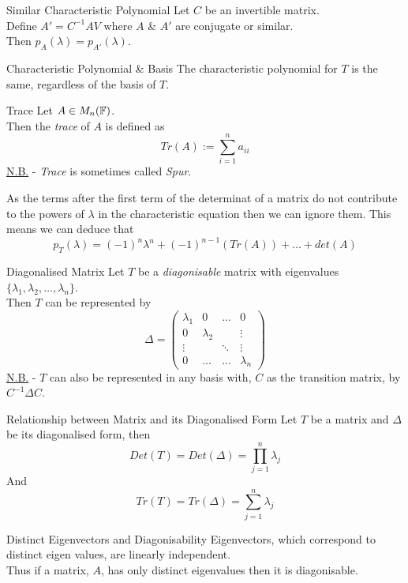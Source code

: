 \documentclass[11pt,a4paper]{article}
\begin{document}
\subtitle{Theorem 8.08 - }{Similar Characteristic Polynomial}
Let $C$ be an invertible matrix.\\
Define $A' = C^{-1}AV$ where $A$ \& $A'$ are conjugate or similar.\\
Then $p_A(\lambda) = p_{A'}(\lambda)$.\\

\subtitle{Theorem 8.09 - }{Characteristic Polynomial \& Basis}
The characteristic polynomial for $T$ is the same, regardless of the basis of $T$.\\

\subtitle{Definition 8.10 - }{Trace}
Let $A \in M_n(\mathbb{F})$.\\
Then the \textit{trace} of $A$ is defined as
$$Tr(A) := \sum_{i=1}^{n}a_{ii}$$
\underline{N.B.} - \textit{Trace} is sometimes called \textit{Spur}.\\

\subtitle{Remark 8.11}{}
As the terms after the first term of the determinat of a matrix do not contribute to the powers of $\lambda$ in the characteristic equation then we can ignore them.
This means we can deduce that
$$p_T(\lambda) = (-1)^n\lambda^n + (-1)^{n-1}(Tr(A)) + \dots + det(A)$$

\subtitle{Theorem 8.12 - }{Diagonalised Matrix}
Let $T$ be a \textit{diagonisable} matrix with eigenvalues $\{\lambda_1, \lambda_2, \dots , \lambda_n\}$.\\
Then $T$ can be represented by $$\Delta = \begin{pmatrix} \lambda_1 & 0  & \dots & 0\\ 0 & \lambda_2 & & \vdots \\ \vdots & & \ddots & \vdots \\ 0 & \dots & \dots & \lambda_n \end{pmatrix}$$
\underline{N.B.} - $T$ can also be represented in any basis with, $C$ as the transition matrix, by $C^{-1}\Delta C$.\\

\subtitle{Theorem 8.13 - }{Relationship between Matrix and its Diagonalised Form}
Let $T$ be a matrix and $\Delta$ be its diagonalised form, then
$$Det(T) = Det(\Delta) = \prod_{j=1}^n \lambda_j$$
And $$Tr(T) = Tr(\Delta) = \sum_{j=1}^n \lambda_j$$

\subtitle{Theorem 8.14 - }{Distinct Eigenvectors and Diagonisability}
Eigenvectors, which correspond to distinct eigen values, are linearly independent.\\
Thus if a matrix, $A$, has only distinct eigenvalues then it is diagonisable.
\end{document}
